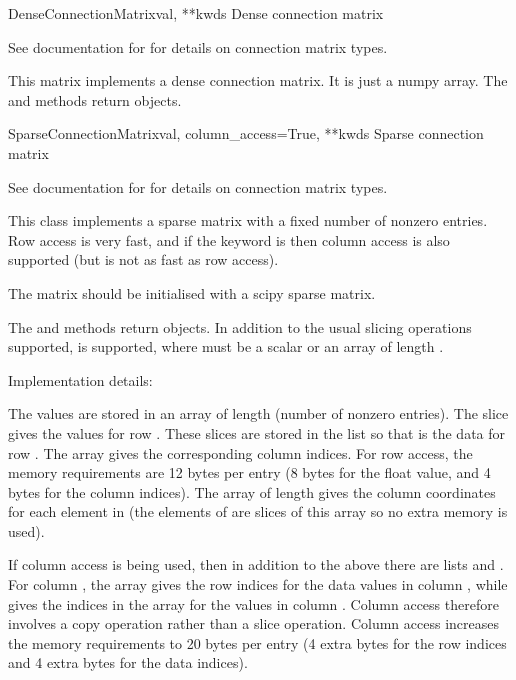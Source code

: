 \documentclass[letterpaper,10pt,english]{manual}
\begin{document}
\hypertarget{brian.DenseConnectionMatrix}{}\begin{classdesc}{DenseConnectionMatrix}{val, **kwds}
Dense connection matrix

See documentation for \hyperlink{brian.ConnectionMatrix}{} for details on
connection matrix types.

This matrix implements a dense connection matrix. It is just
a numpy array. The  and  methods return
 objects.
\end{classdesc}

\hypertarget{brian.SparseConnectionMatrix}{}\begin{classdesc}{SparseConnectionMatrix}{val, column\_access=True, **kwds}
Sparse connection matrix

See documentation for \hyperlink{brian.ConnectionMatrix}{} for details on
connection matrix types.

This class implements a sparse matrix with a fixed number of nonzero
entries. Row access is very fast, and if the  keyword
is  then column access is also supported (but is not as fast
as row access).

The matrix should be initialised with a scipy sparse matrix.

The  and  methods return
\hyperlink{brian.SparseConnectionVector}{} objects. In addition to the
usual slicing operations supported,  is supported, where
 must be a scalar or an array of length .

Implementation details:

The values are stored in an array  of length  (number
of nonzero entries). The slice  gives
the values for row . These slices are stored in the list 
so that  is the data for row . The array 
gives the corresponding column  indices. For row access, the
memory requirements are 12 bytes per entry (8 bytes for the float value,
and 4 bytes for the column indices). The array  of length 
gives the column  coordinates for each element in  (the
elements of  are slices of this array so no extra memory is
used).

If column access is being used, then in addition to the above there are
lists  and . For column , the array
 gives the row indices for the data values in column ,
while  gives the indices in the array 
for the values in column . Column access therefore involves a
copy operation rather than a slice operation. Column access increases
the memory requirements to 20 bytes per entry (4 extra bytes for the
row indices and 4 extra bytes for the data indices).
\end{classdesc}
\end{document}
